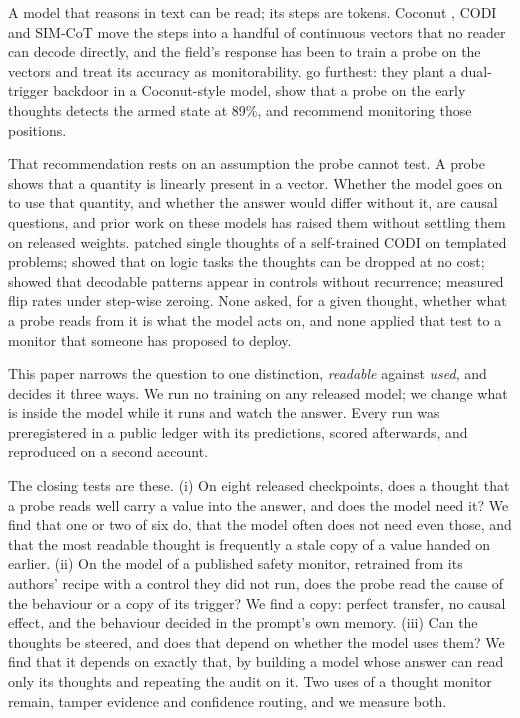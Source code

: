 \documentclass{article}
\begin{document}
A model that reasons in text can be read; its steps are tokens. Coconut \citep{hao2024coconut}, CODI \citep{shen2025codi} and SIM-CoT \citep{wei2026simcot} move the steps into a handful of continuous vectors that no reader can decode directly, and the field's response has been to train a probe on the vectors and treat its accuracy as monitorability. \citet{ramjee2026ulterior} go furthest: they plant a dual-trigger backdoor in a Coconut-style model, show that a probe on the early thoughts detects the armed state at 89\%, and recommend monitoring those positions.

That recommendation rests on an assumption the probe cannot test. A probe shows that a quantity is linearly present in a vector. Whether the model goes on to use that quantity, and whether the answer would differ without it, are causal questions, and prior work on these models has raised them without settling them on released weights. \citet{cywinski2025} patched single thoughts of a self-trained CODI on templated problems; \citet{dilgren2026interpretable} showed that on logic tasks the thoughts can be dropped at no cost; \citet{aswal2026observable} showed that decodable patterns appear in controls without recurrence; \citet{li2026dynamics} measured flip rates under step-wise zeroing. None asked, for a given thought, whether what a probe reads from it is what the model acts on, and none applied that test to a monitor that someone has proposed to deploy.

This paper narrows the question to one distinction, \emph{readable} against \emph{used}, and decides it three ways. We run no training on any released model; we change what is inside the model while it runs and watch the answer. Every run was preregistered in a public ledger with its predictions, scored afterwards, and reproduced on a second account.

The closing tests are these. (i) On eight released checkpoints, does a thought that a probe reads well carry a value into the answer, and does the model need it? We find that one or two of six do, that the model often does not need even those, and that the most readable thought is frequently a stale copy of a value handed on earlier. (ii) On the model of a published safety monitor, retrained from its authors' recipe with a control they did not run, does the probe read the cause of the behaviour or a copy of its trigger? We find a copy: perfect transfer, no causal effect, and the behaviour decided in the prompt's own memory. (iii) Can the thoughts be steered, and does that depend on whether the model uses them? We find that it depends on exactly that, by building a model whose answer can read only its thoughts and repeating the audit on it. Two uses of a thought monitor remain, tamper evidence and confidence routing, and we measure both.
\end{document}
